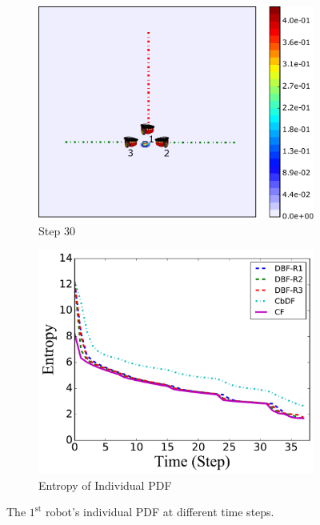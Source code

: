 \documentclass[journal]{IEEEtranTIE}
\theoremstyle{remark}
\begin{document}
\begin{figure}
\begin{subfigure}[b]{0.21\textwidth}
			\includegraphics[width=\textwidth]{sonar_mov_sen_sta_tar_rbt1_step30_16-TIE-3798}
			\caption{Step 30}\label{fig:sonar_mov_sen_sta_tar_rbt1_step30}
		\end{subfigure}	
		\begin{subfigure}[b]{0.21\textwidth}
			\includegraphics[width=\textwidth]{sonar_entropy_modified_16-TIE-3798}
			\caption{Entropy of Individual PDF}\label{fig:sonar_entropy}
		\end{subfigure}	
		\caption{The $1^\text{st}$ robot's individual PDF at different time steps.}
	\end{figure}
	
\end{document}

